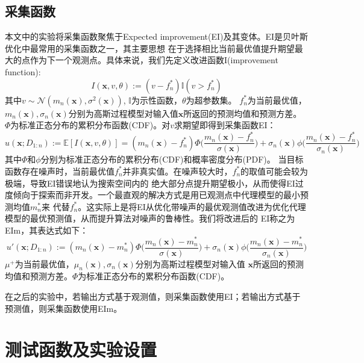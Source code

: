 \documentclass[a4paper,10pt]{article}
\begin{document}
  \subsection{采集函数}
本文中的实验将采集函数聚焦于Expected improvement(EI)及其变体。EI是贝叶斯优化中最常用的采集函数之一，其主要思想
在于选择相比当前最优值提升期望最大的点作为下一个观测点。具体来说，我们先定义改进函数I(improvement function):
\begin{equation}\label{eq1}
\textit{I}(\textbf{x},v,\theta):=(v-f^*_n)\mathbb{I}(v>f^*_n)
\end{equation}
其中$v\sim \mathcal{N}(m_n(\textbf{x}),\sigma^2(\textbf{x}))$, $\mathbb{I}$为示性函数，$\theta$为超参数集。
$f^*_n$为当前最优值，$m_n(\textbf{x}),\sigma_n(\textbf{x})$分别为高斯过程模型对输入值$\textbf{x}$所返回的预测均值和预测方差。
$\Phi$为标准正态分布的累积分布函数(CDF)。对$v$求期望即得到采集函数EI：
\begin{equation}\label{eq1}
u(\textbf{x};D_{1:n}):=\mathbb{E}[\textit{I}(\textbf{x},v,\theta)]=(m_n(\textbf{x})-f^*_n)\Phi \Big(\frac{m_n(\textbf{x})-f^*_n}{\sigma(\textbf{x})}\Big)+\sigma_n(\textbf{x})\phi \Big(\frac{m_n(\textbf{x})-f^*_n}{\sigma_n(\textbf{x})} \Big)
\end{equation}
其中$\Phi$和$\phi$分别为标准正态分布的累积分布(CDF)和概率密度分布(PDF)。
当目标函数存在噪声时，当前最优值$f^*_n$并非真实值。在噪声较大时，$f^*_n$的取值可能会较为极端，导致EI错误地认为搜索空间内的
绝大部分点提升期望极小，从而使得EI过度倾向于探索而非开发。一个最直观的解决方式是用已观测点中代理模型的最小预测均值$m^*_n$来
代替$f^*_n$。这实际上是将EI从优化带噪声的最优观测值改进为优化代理模型的最优预测值，从而提升算法对噪声的鲁棒性。我们将改进后的
EI称之为EIm，其表达式如下：
\begin{equation}\label{eq1}
  u'(\textbf{x};D_{1:n}):=(m_n(\textbf{x})-m^*_n)\Phi \Big(\frac{m_n(\textbf{x})-m^*_n}{\sigma(\textbf{x})}\Big)+\sigma_n(\textbf{x})\phi \Big(\frac{m_n(\textbf{x})-m^*_n}{\sigma_n(\textbf{x})} \Big)
  \end{equation}
  $\mu^+$为当前最优值，$\mu_n(\textbf{x}),\sigma_n(\textbf{x})$分别为高斯过程模型对输入值
  $\textbf{x}$所返回的预测均值和预测方差。$\Phi$为标准正态分布的累积分布函数(CDF)。

在之后的实验中，若输出方式基于观测值，则采集函数使用EI；若输出方式基于预测值，则采集函数使用EIm。

\section{测试函数及实验设置}
\end{document}
